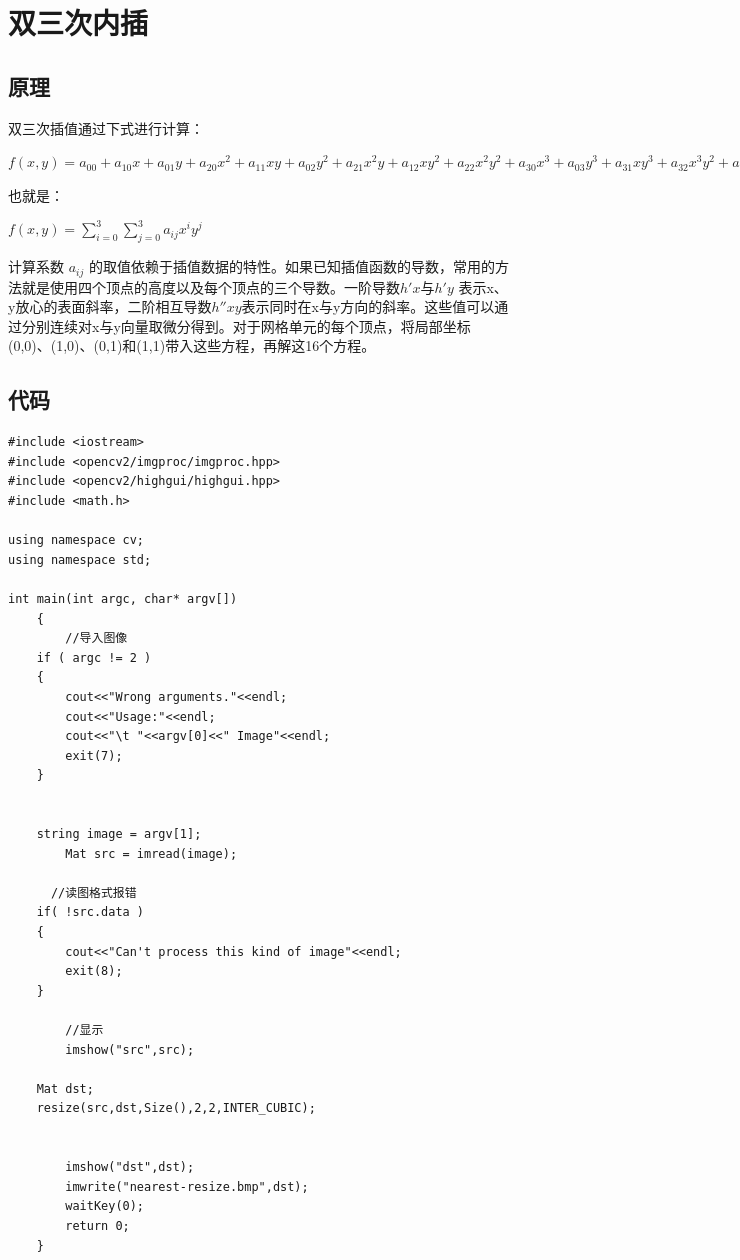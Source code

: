 \documentclass{article}
\begin{document}
\section{双三次内插}

\subsection{原理}
双三次插值通过下式进行计算：

$f(x,y)=a_{00}+a_{10}x+a_{01}y+a_{20}x^{2}+a_{11}xy+a_{02}y^{2}+a_{21}x^{2}y+a_{12}xy^{2}+a_{22}x^{2}y^{2}+a_{30}x^{3}+a_{03}y^{3}+a_{31}xy^{3}+a_{32}x^{3}y^{2}+a_{23}x^{2}y^{3}+a_{33}x^{3}y^{3}$

也就是：

$f(x,y)=\sum _{i=0}^{3}\sum _{j=0}^{3}a_{ij}x^{i}y^{j}$

计算系数 $a_{ij}$ 的取值依赖于插值数据的特性。如果已知插值函数的导数，常用的方法就是使用四个顶点的高度以及每个顶点的三个导数。一阶导数$h'x$与$h'y$ 表示x、y放心的表面斜率，二阶相互导数$h''xy$表示同时在x与y方向的斜率。这些值可以通过分别连续对x与y向量取微分得到。对于网格单元的每个顶点，将局部坐标(0,0)、(1,0)、(0,1)和(1,1)带入这些方程，再解这16个方程。

\newpage
\subsection{代码}

\begin{lstlisting}
#include <iostream> 
#include <opencv2/imgproc/imgproc.hpp>
#include <opencv2/highgui/highgui.hpp>
#include <math.h>

using namespace cv;
using namespace std;

int main(int argc, char* argv[])  
    {  
        //导入图像
	if ( argc != 2 )
	{
		cout<<"Wrong arguments."<<endl;
		cout<<"Usage:"<<endl;
		cout<<"\t "<<argv[0]<<" Image"<<endl;
		exit(7);
	}


	string image = argv[1];
        Mat src = imread(image);  

      //读图格式报错
	if( !src.data )
	{
		cout<<"Can't process this kind of image"<<endl;
		exit(8);
	}

        //显示  
        imshow("src",src);  
      
	Mat dst;
	resize(src,dst,Size(),2,2,INTER_CUBIC);        

      
        imshow("dst",dst);  
     	imwrite("nearest-resize.bmp",dst); 
        waitKey(0);  
        return 0;  
    }  
\end{lstlisting}
\newpage
\end{document}
